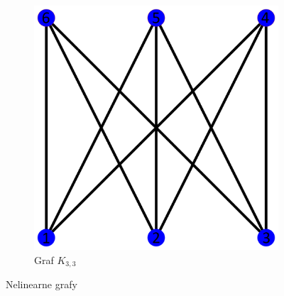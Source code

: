 \begin{figure}[h]
\begin{subfigure}[b]{0.3\textwidth}
        \includegraphics[width=\textwidth]{doc/fig/K33.png}
        \caption{Graf $K_{3,3}$}
        \label{fig:graph-k33}
    \end{subfigure}
    \caption{Nelinearne grafy}
    \label{fig:non_planar_graphs}
\end{figure}
